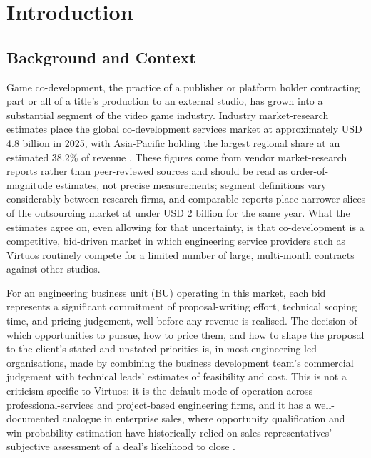 \hypertarget{introduction}{%
\chapter{Introduction}\label{introduction}}

\hypertarget{background-and-context}{%
\section{Background and Context}\label{background-and-context}}

Game co-development, the practice of a publisher or platform holder
contracting part or all of a title's production to an external studio,
has grown into a substantial segment of the video game industry.
Industry market-research estimates place the global co-development
services market at approximately USD 4.8 billion in 2025, with
Asia-Pacific holding the largest regional share at an estimated 38.2\%
of revenue \citep{marketintelo2025gamecodev}. These figures come from
vendor market-research reports rather than peer-reviewed sources and
should be read as order-of-magnitude estimates, not precise
measurements; segment definitions vary considerably between research
firms, and comparable reports place narrower slices of the outsourcing
market at under USD 2 billion for the same year. What the estimates
agree on, even allowing for that uncertainty, is that co-development is
a competitive, bid-driven market in which engineering service providers
such as Virtuos routinely compete for a limited number of large,
multi-month contracts against other studios.

For an engineering business unit (BU) operating in this market, each bid
represents a significant commitment of proposal-writing effort,
technical scoping time, and pricing judgement, well before any revenue
is realised. The decision of which opportunities to pursue, how to price
them, and how to shape the proposal to the client's stated and unstated
priorities is, in most engineering-led organisations, made by combining
the business development team's commercial judgement with technical
leads' estimates of feasibility and cost. This is not a criticism
specific to Virtuos: it is the default mode of operation across
professional-services and project-based engineering firms, and it has a
well-documented analogue in enterprise sales, where opportunity
qualification and win-probability estimation have historically relied on
sales representatives' subjective assessment of a deal's likelihood to
close \citep{yan2015sales}.


